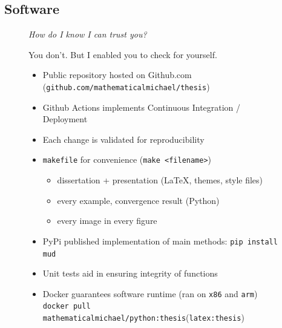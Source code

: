 \subsection{Software}

\begin{frame}[t]
\centering
\begin{figure}
\centering

\emph{How do I know I can trust you?}

\vspace{0.25in}

You don't. But I enabled you to check for yourself.

\vspace{0.25in}

\begin{itemize}
	\item Public repository hosted on Github.com ({\tt github.com/mathematicalmichael/thesis})
	\item Github Actions implements Continuous Integration / Deployment
	\item Each change is validated for reproducibility
	\item {\tt makefile} for convenience ({\tt make <filename>})
	\begin{itemize}
		\item dissertation + presentation (\LaTeX, themes, style files)
		\item every example, convergence result (Python)
		\item every image in every figure
	\end{itemize}
	\item PyPi published implementation of main methods: {\tt pip install mud}
	\item Unit tests aid in ensuring integrity of functions
	\item Docker guarantees software runtime (ran on {\tt x86} and {\tt arm}) \\ {\tt docker pull mathematicalmichael/python:thesis}({\tt latex:thesis})
\end{itemize}

\end{figure}

\end{frame}
